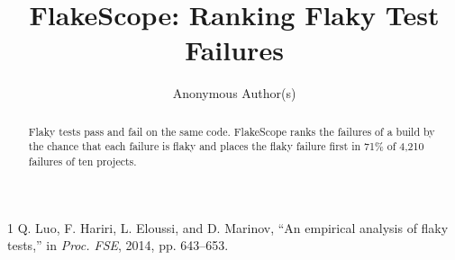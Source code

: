 \documentclass[a4paper,12pt]{article}
\begin{document}
\title{FlakeScope: Ranking Flaky Test Failures}
\author{Anonymous Author(s)}
\maketitle
\begin{abstract}
Flaky tests pass and fail on the same code. FlakeScope ranks the failures of a build by the chance that each
failure is flaky and places the flaky failure first in 71\% of 4,210 failures of ten projects.
\end{abstract}

\begin{thebibliography}{1}
 Q. Luo, F. Hariri, L. Eloussi, and D. Marinov, ``An empirical analysis of flaky tests,'' in
\emph{Proc. FSE}, 2014, pp. 643--653.
\end{thebibliography}
\end{document}
